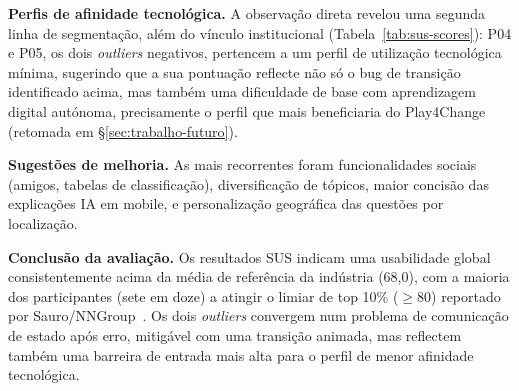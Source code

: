 \textbf{Perfis de afinidade tecnológica.} A observação direta revelou uma segunda linha de segmentação, além do vínculo institucional (Tabela~\ref{tab:sus-scores}): P04 e P05, os dois \textit{outliers} negativos, pertencem a um perfil de utilização tecnológica mínima, sugerindo que a sua pontuação reflecte não só o bug de transição identificado acima, mas também uma dificuldade de base com aprendizagem digital autónoma, precisamente o perfil que mais beneficiaria do Play4Change (retomada em §\ref{sec:trabalho-futuro}).

\textbf{Sugestões de melhoria.} As mais recorrentes foram funcionalidades sociais (amigos, tabelas de classificação), diversificação de tópicos, maior concisão das explicações IA em mobile, e personalização geográfica das questões por localização.

\textbf{Conclusão da avaliação.} Os resultados SUS indicam uma usabilidade global consistentemente acima da média de referência da indústria (68,0), com a maioria dos participantes (sete em doze) a atingir o limiar de top 10\% ($\geq$80) reportado por Sauro/NNGroup~\cite{nngroup2018}. Os dois \textit{outliers} convergem num problema de comunicação de estado após erro, mitigável com uma transição animada, mas reflectem também uma barreira de entrada mais alta para o perfil de menor afinidade tecnológica.

